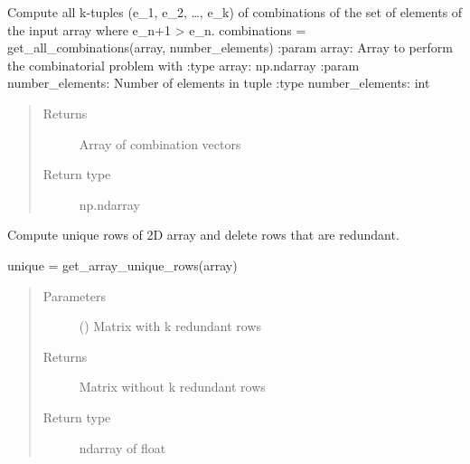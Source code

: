 \documentclass[letterpaper,10pt,english,openany,oneside]{sphinxmanual}
\begin{document}

\begin{fulllineitems}
\label{\detokenize{pygpc:pygpc.misc.get_all_combinations}}
Compute all k-tuples (e\_1, e\_2, …, e\_k) of combinations of the set of elements of the input array where
e\_n+1 \textgreater{} e\_n.
combinations = get\_all\_combinations(array, number\_elements)
:param array: Array to perform the combinatorial problem with
:type array: np.ndarray
:param number\_elements: Number of elements in tuple
:type number\_elements: int
\begin{quote}\begin{description}
\item[{Returns}] \leavevmode
{} \textendash{} Array of combination vectors

\item[{Return type}] \leavevmode
np.ndarray

\end{description}\end{quote}

\end{fulllineitems}


\begin{fulllineitems}
\label{\detokenize{pygpc:pygpc.misc.get_array_unique_rows}}
Compute unique rows of 2D array and delete rows that are redundant.

unique = get\_array\_unique\_rows(array)
\begin{quote}\begin{description}
\item[{Parameters}] \leavevmode
{} () \textendash{} Matrix with k redundant rows

\item[{Returns}] \leavevmode
{} \textendash{} Matrix without k redundant rows

\item[{Return type}] \leavevmode
ndarray of float

\end{description}\end{quote}

\end{fulllineitems}
\end{document}
